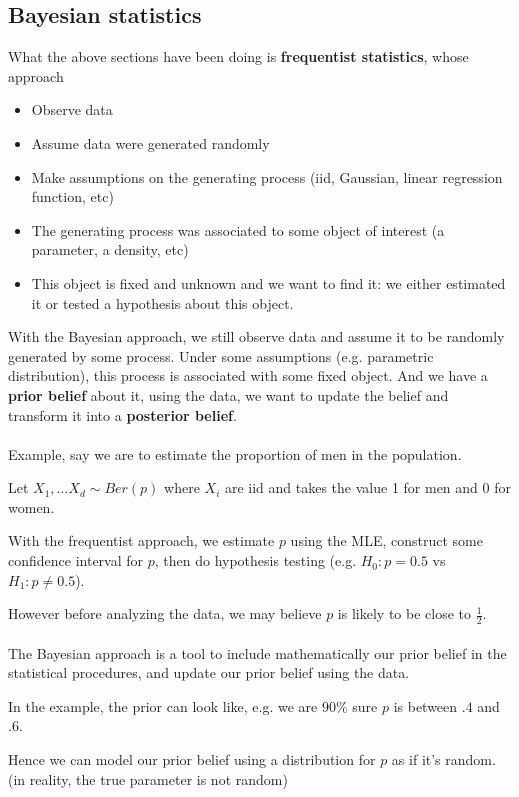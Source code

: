 \documentclass{article}
\begin{document}
\subsection{Bayesian statistics}

What the above sections have been doing is \textbf{frequentist statistics}, whose approach
\begin{itemize}
  \item Observe data
  \item Assume data were generated randomly
  \item Make assumptions on the generating process (iid, Gaussian, linear regression function, etc)
  \item The generating process was associated to some object of interest (a parameter, a density, etc)
  \item This object is fixed and unknown and we want to find it: we either estimated it or tested a hypothesis about this object.
\end{itemize}

With the Bayesian approach, we still observe data and assume it to be randomly generated by some process.
Under some assumptions (e.g. parametric distribution), this process is associated with some fixed object.
And we have a \textbf{prior belief} about it, using the data, we want to update the belief and transform it into a \textbf{posterior belief}.
\\
\\
Example, say we are to estimate the proportion of men in the population.

Let $X_1, \dots X_d \sim Ber(p)$ where $X_i$ are iid and takes the value 1 for men and 0 for women.

With the frequentist approach, we estimate $p$ using the MLE, construct some confidence interval for $p$,
then do hypothesis testing (e.g. $H_0: p = 0.5$ vs $H_1: p \neq 0.5$).

However before analyzing the data, we may believe $p$ is likely to be close to $\frac{1}{2}$.
\\
\\
The Bayesian approach is a tool to include mathematically our prior belief in the statistical procedures,
and update our prior belief using the data.

In the example, the prior can look like, e.g. we are $90\%$ sure $p$ is between $.4$ and $.6$.

Hence we can model our prior belief using a distribution for $p$ as if it's random.
(in reality, the true parameter is not random)
\end{document}
